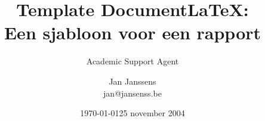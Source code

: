 \documentclass{article}
\title{Template Document}
\author{Academic Support Agent}
\date{\today}
\begin{document}
\maketitle


\title{LaTeX:\\Een sjabloon voor een rapport}
\author{Jan Janssens\\jan@jansenss.be}
\date{25 november 2004}
\maketitle


%
%









\end{document}
